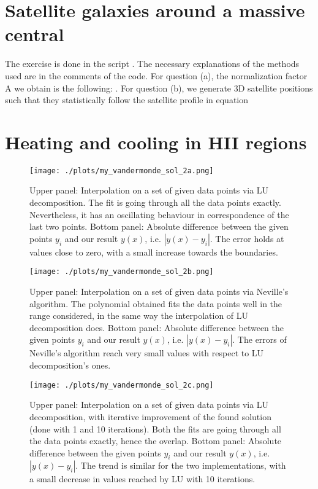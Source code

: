 \section{Satellite galaxies around a massive central}
The exercise is done in the script . The necessary explanations of the methods used are in the comments of the code.
For question (a), the normalization factor A we obtain is the following: .
For question (b), we generate 3D satellite positions such that they statistically follow the satellite profile in equation 

\section{Heating and cooling in HII regions}

\begin{figure}[h!]
  \centering
  \texttt{[image: ./plots/my\_vandermonde\_sol\_2a.png]}
  \caption{Upper panel: Interpolation on a set of given data points via LU decomposition. The fit is going through all the data points exactly. Nevertheless, it has an oscillating behaviour in correspondence of the last two points. Bottom panel: Absolute difference between the given points $y_i$ and our result $y(x)$, i.e. $|y(x) - y_{i}|$. The error holds at values close to zero, with a small increase towards the boundaries.}
  \label{fig:lu_dec}
\end{figure}

\begin{figure}[h!]
  \centering
  \texttt{[image: ./plots/my\_vandermonde\_sol\_2b.png]}
  \caption{Upper panel: Interpolation on a set of given data points via Neville's algorithm. The polynomial obtained fits the data points well in the range considered, in the same way the interpolation of LU decomposition does. Bottom panel: Absolute difference between the given points $y_i$ and our result $y(x)$, i.e. $|y(x) - y_{i}|$. The errors of Neville's algorithm reach very small values with respect to LU decomposition's ones. }
  \label{fig:neville}
\end{figure}

\begin{figure}[h!]
  \centering
  \texttt{[image: ./plots/my\_vandermonde\_sol\_2c.png]}
  \caption{Upper panel: Interpolation on a set of given data points via LU decomposition, with iterative improvement of the found solution (done with 1 and 10 iterations). Both the fits are going through all the data points exactly, hence the overlap. Bottom panel: Absolute difference between the given points $y_i$ and our result $y(x)$, i.e. $|y(x) - y_{i}|$. The trend is similar for the two implementations, with a small decrease in values reached by LU with 10 iterations.}
  \label{fig:lu_iter}
\end{figure}
